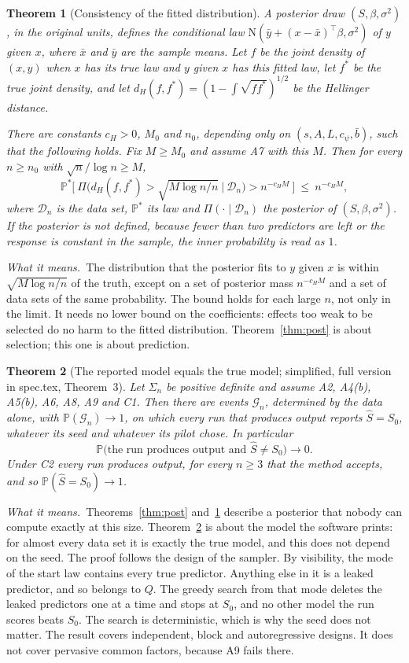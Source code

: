 \documentclass[11pt]{article}
\renewcommand{\P}{\mathbb{P}}
\newcommand{\N}{\mathrm{N}}
\newcommand{\Sz}{S_0}
\newcommand{\Sig}{\Sigma_n}
\newcommand{\Shat}{\hat S}
\newcommand{\Dn}{\mathcal D_n}
\theoremstyle{plain}
\newtheorem{thm}{Theorem}
\theoremstyle{definition}
\newcommand{\means}{\par\smallskip\noindent\textit{What it means.}\ }
\begin{document}
\begin{thm}[Consistency of the fitted distribution]\label{thm:dist}
A posterior draw $(S,\beta,\sigma^2)$, in the original units, defines the conditional law
$\N(\bar y+(x-\bar x)^\top\beta,\sigma^2)$ of $y$ given $x$, where $\bar x$ and $\bar y$ are the sample means. Let $f$
be the joint density of $(x,y)$ when $x$ has its true law and $y$ given $x$ has this fitted law, let $f^*$ be the true
joint density, and let $d_H(f,f^*)=(1-\int\!\sqrt{ff^*})^{1/2}$ be the Hellinger distance.

There are constants $c_H>0$, $M_0$ and $n_0$, depending only on $(s,A,L,c_\psi,\bar b)$, such that the following holds.
Fix $M\ge M_0$ and assume A7 with this $M$. Then for every $n\ge n_0$ with $\sqrt n/\log n\ge M$,
\[
  \P^*\Big[\ \Pi\Big(d_H(f,f^*)>\sqrt{M\log n/n}\ \Big|\ \Dn\Big)>n^{-c_HM}\ \Big]\ \le\ n^{-c_HM},
\]
where $\Dn$ is the data set, $\P^*$ its law and $\Pi(\cdot\mid\Dn)$ the posterior of $(S,\beta,\sigma^2)$. If the
posterior is not defined, because fewer than two predictors are left or the response is constant in the sample, the
inner probability is read as $1$.
\end{thm}
\means The distribution that the posterior fits to $y$ given $x$ is within $\sqrt{M\log n/n}$ of the truth, except on
a set of posterior mass $n^{-c_HM}$ and a set of data sets of the same probability. The bound holds for each large $n$,
not only in the limit. It needs no lower bound on the coefficients: effects too weak to be selected do no harm to the
fitted distribution. Theorem~\ref{thm:post} is about selection; this one is about prediction.

\begin{thm}[The reported model equals the true model; simplified, full version in spec.tex, Theorem~3]\label{thm:reported}
Let $\Sig$ be positive definite and assume A2, A4(b), A5(b), A6, A8, A9 and C1. Then there are events $\mathcal G_n$,
determined by the data alone, with $\P(\mathcal G_n)\to1$, on which every run that produces output reports
$\Shat=\Sz$, whatever its seed and whatever its pilot chose. In particular
\[
  \P\big(\text{the run produces output and }\Shat\neq\Sz\big)\to0 .
\]
Under C2 every run produces output, for every $n\ge3$ that the method accepts, and so $\P(\Shat=\Sz)\to1$.
\end{thm}
\means Theorems~\ref{thm:post} and~\ref{thm:dist} describe a posterior that nobody can compute exactly at this size.
Theorem~\ref{thm:reported} is about the model the software prints: for almost every data set it is exactly the true
model, and this does not depend on the seed. The proof follows the design of the sampler. By visibility, the mode of
the start law contains every true predictor. Anything else in it is a leaked predictor, and so belongs to $Q$. The
greedy search from that mode deletes the leaked predictors one at a time and stops at $\Sz$, and no other model the run
scores beats $\Sz$. The search is deterministic, which is why the seed does not matter. The result covers independent,
block and autoregressive designs. It does not cover pervasive common factors, because A9 fails there.
\end{document}
